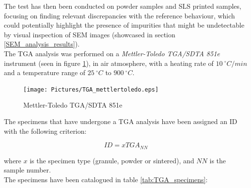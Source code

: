 \documentclass{article}
\begin{document}
            The test has then been conducted on powder samples and SLS printed samples, focusing on finding relevant 
            discrepancies with the reference behaviour, which could potentially highlight the presence of impurities
            that might be undetectable by visual inspection of SEM images (showcased in section \ref{SEM_analysis_results}). \\ 

            The TGA analysis was performed on a \textit{Mettler-Toledo TGA/SDTA 851e} \autocites{Mettler_Toledo} instrument (seen in figure \ref{fig:TGA_mettlertoledo}), 
            in air atmosphere, with a heating rate of $10 \ ^{\circ}C/min$ and a temperature range of $25 \ ^{\circ}C$ to $900 \ ^{\circ}C$. \\

            \begin{figure}[h!]
                \centering
                \texttt{[image: Pictures/TGA\_mettlertoledo.eps]}
                \caption{Mettler-Toledo TGA/SDTA 851e \autocites{Mettler_Toledo}}
                \label{fig:TGA_mettlertoledo}
            \end{figure}

            The specimens that have undergone a TGA analysis have been assigned an ID with the following criterion:

                \begin{equation}
                    ID = xTGA_{NN}
                    \label{eq:TGA_ID}
                \end{equation}

            where $x$ is the specimen type (granule, powder or sintered), and $NN$ is the sample number. \\

            The specimens have been catalogued in table \ref{tab:TGA_specimens}:

                    \begin{table}[h!]
                        \centering
                        \caption{TGA specimens}
        
                        \label{tab:TGA_specimens}
                    \end{table}
\end{document}
